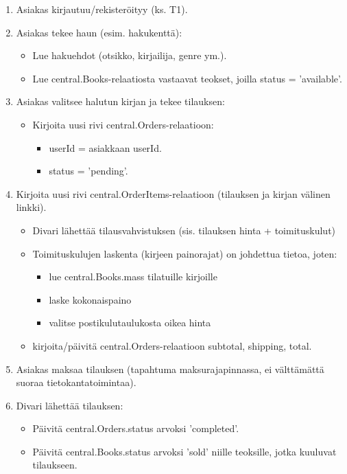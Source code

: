 \documentclass[11pt,a4paper]{article}
\begin{document}
\begin{enumerate}
	\item Asiakas kirjautuu/rekisteröityy (ks. T1).
	\item Asiakas tekee haun (esim. hakukenttä):
	      \begin{itemize}
		      \item Lue hakuehdot (otsikko, kirjailija, genre ym.).
		      \item Lue central.Books-relaatiosta vastaavat teokset, joilla status = 'available'.
	      \end{itemize}
	\item Asiakas valitsee halutun kirjan ja tekee tilauksen:
	      \begin{itemize}
		      \item Kirjoita uusi rivi central.Orders-relaatioon:
		            \begin{itemize}
			            \item userId = asiakkaan userId.
			            \item status = 'pending'.
		            \end{itemize}
	      \end{itemize}
	\item Kirjoita uusi rivi central.OrderItems-relaatioon (tilauksen ja kirjan välinen linkki).
	      \begin{itemize}
		      \item Divari lähettää tilausvahvistuksen (sis. tilauksen hinta + toimituskulut)
		      \item Toimituskulujen laskenta (kirjeen painorajat) on johdettua tietoa, joten:
		            \begin{itemize}
			            \item lue central.Books.mass tilatuille kirjoille
			            \item laske kokonaispaino
			            \item valitse postikulutaulukosta oikea hinta
		            \end{itemize}
		      \item kirjoita/päivitä central.Orders-relaatioon subtotal, shipping, total.
	      \end{itemize}
	\item Asiakas maksaa tilauksen (tapahtuma maksurajapinnassa, ei välttämättä suoraa tietokantatoimintaa).
	\item Divari lähettää tilauksen:
	      \begin{itemize}
		      \item Päivitä central.Orders.status arvoksi 'completed'.
		      \item Päivitä central.Books.status arvoksi 'sold' niille teoksille, jotka kuuluvat tilaukseen.
	      \end{itemize}
\end{enumerate}
\end{document}
